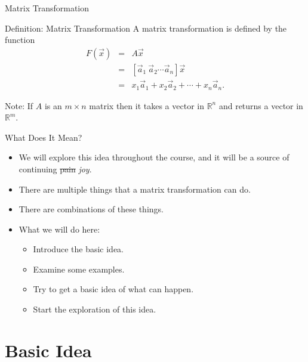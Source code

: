 \documentclass[svgnames,table,,aspectratio=169]{beamer}
\begin{document}
\begin{frame}{Matrix Transformation}

  \begin{block}{Definition: Matrix Transformation}
    A matrix transformation is defined by the function
    \begin{eqnarray*}
      F\left(\vec{x}\right) & = & A\vec{x} \\
                            & = & \left[ \vec{a}_1 ~ \vec{a}_2 \cdots \vec{a}_n  \right] \vec{x} \\
                            & = & x_1 \vec{a}_1 + x_2 \vec{a}_2 + \cdots + x_n \vec{a}_n.
    \end{eqnarray*}

  \end{block}

  Note: If $A$ is an $m\times n$ matrix then it takes a vector in
  ${\mathbb R}^n$ and returns a vector in ${\mathbb R}^m$.
    

\end{frame}


\begin{frame}{What Does It Mean?}

  \begin{itemize}
  \item We will explore this idea throughout the course, and it will
    be a source of continuing \sout{pain} \textit{joy}.
  \item There are multiple things that a matrix transformation can do.
  \item There are combinations of these things.
  \item What we will do here:
    \begin{itemize}
    \item Introduce the basic idea.
    \item Examine some examples.
    \item Try to get a basic idea of what can happen.
    \item Start the exploration of this idea.
    \end{itemize}
  \end{itemize}
  
\end{frame}

\section{Basic Idea}
\end{document}

